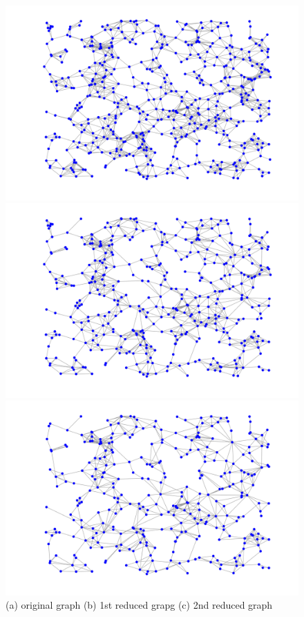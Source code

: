 \documentclass[a4paper]{article}
\begin{document}
\begin{figure}[H]
\centering
\includegraphics[width = 12 cm]{0629/graph}

\includegraphics[width = 12 cm]{0629/1st_downsampled}

\includegraphics[width = 12cm]{0629/2nd_downsampled}
\caption{ (a) original graph (b) 1st reduced grapg (c) 2nd reduced graph}
\end{figure}
\end{document}

